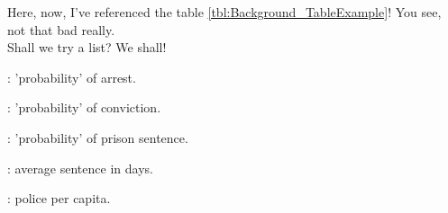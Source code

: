 Here, now, I've referenced the table \ref{tbl:Background_TableExample}!  You see, not that bad really. \\

Shall we try a list?  We shall!

\begin{description}[font=$\bullet$~\normalfont\scshape\normalsize\color{red!50!black}]
	\item [prbarr] {\fontsize{10}{10} \selectfont : 'probability' of arrest.}
	\item [prbconv] {\fontsize{10}{10} \selectfont : 'probability' of conviction.}
	\item [prbpris] {\fontsize{10}{10} \selectfont : 'probability' of prison sentence.}
	\item [avgsen] {\fontsize{10}{10} \selectfont : average sentence in days.}
	\item [polpc] {\fontsize{10}{10} \selectfont : police per capita.}
\end{description}

\endgroup